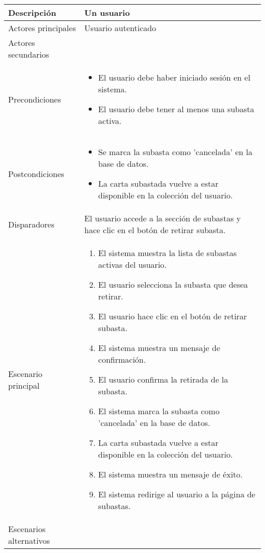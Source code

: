 \begin{longtable}{
    >{\columncolor{lightgreen!20}}p{4cm}
    p{12cm}
    }
    \midrule
    Descripción & Un usuario  \\
    \midrule
    Actores principales & Usuario autenticado \\
    \midrule
    Actores secundarios &  \\
    \midrule
    Precondiciones & \begin{itemize}[nosep,leftmargin=*]
        \item El usuario debe haber iniciado sesión en el sistema.
        \item El usuario debe tener al menos una subasta activa.
    \end{itemize} \\
    \midrule
    Postcondiciones & \begin{itemize}[nosep,leftmargin=*]
        \item Se marca la subasta como 'cancelada' en la base de datos.
        \item La carta subastada vuelve a estar disponible en la colección del usuario.
    \end{itemize} \\
    \midrule
    Disparadores & El usuario accede a la sección de subastas y hace clic en el botón de retirar subasta. \\
    \midrule
    Escenario principal & \begin{enumerate}[nosep,leftmargin=*]
        \item El sistema muestra la lista de subastas activas del usuario.
        \item El usuario selecciona la subasta que desea retirar.
        \item El usuario hace clic en el botón de retirar subasta.
        \item El sistema muestra un mensaje de confirmación.
        \item El usuario confirma la retirada de la subasta.
        \item El sistema marca la subasta como 'cancelada' en la base de datos.
        \item La carta subastada vuelve a estar disponible en la colección del usuario.
        \item El sistema muestra un mensaje de éxito.
        \item El sistema redirige al usuario a la página de subastas.
    \end{enumerate} \\
    \midrule
    Escenarios alternativos & 
    \begin{itemize}[nosep,leftmargin=*]

\end{itemize}
\end{longtable}

